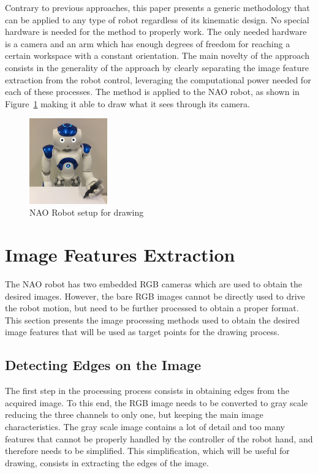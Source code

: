 \documentclass[conference]{IEEEtran}
\begin{document}
Contrary to previous approaches, this paper presents a generic methodology that can be applied to any type of robot regardless of its kinematic design. No special hardware is needed for the method to properly work. The only needed hardware is a camera and an arm which has enough degrees of freedom for reaching a certain workspace with a constant orientation. The main novelty of the approach consists in the generality of the approach by clearly separating the image feature extraction from the robot control, leveraging the computational power needed for each of these processes. The method is applied to the NAO robot, as shown in Figure~\ref{fig:nao} making it able to draw what it sees through its camera.
\begin{figure}
  \centering
  \captionsetup{font=footnotesize}
  \includegraphics[width=0.3\textwidth]{nao-setup.jpg}
  \caption{NAO Robot setup for drawing}
  \label{fig:nao}
\end{figure}

\section{Image Features Extraction}
\label{sec:image}

The NAO robot has two embedded RGB cameras which are used to obtain the desired images. However, the bare RGB images cannot be directly used to drive the robot motion, but need to be further processed to obtain a proper format. This section presents the image processing methods used to obtain the desired image features that will be used as target points for the drawing process.

\subsection{Detecting Edges on the Image}

The first step in the processing process consists in obtaining edges from the acquired image. To this end, the RGB image needs to be converted to gray scale reducing the three channels to only one, but keeping the main image characteristics. The gray scale image contains a lot of detail and too many features that cannot be properly handled by the controller of the robot hand, and therefore needs to be simplified. This simplification, which will be useful for drawing, consists in extracting the edges of the image.
\end{document}
